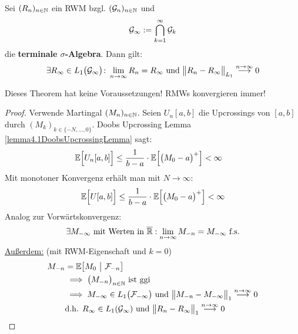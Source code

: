 \begin{theorem}\label{theorem5.5KonvergenzVonRWMs}\enter
Sei $(R_n)_{n\in\mathbb{N}}$ ein RWM bzgl. $(\mathcal{G}_n)_{n\in\mathbb{N}}$ und 
\begin{align*}
\mathcal{G}_\infty:=\bigcap\limits_{k=1}^\infty\mathcal{G}_k
\end{align*}
die \textbf{terminale $\sigma$-Algebra}. Dann gilt:
\begin{align*}
	\exists R_\infty\in L_1\big(\mathcal{G}_\infty\big)\colon\lim\limits_{n\to\infty} R_n=R_\infty \text{ und } \big\Vert R_n-R_\infty\big\Vert_{L_1}\stackrel{n\to\infty}{\longrightarrow}0
\end{align*}
\end{theorem}

\begin{bemerkung}
Dieses Theorem hat keine Voraussetzungen! RMWs konvergieren immer!
\end{bemerkung}

\begin{proof}
	Verwende Martingal $(M_n)_{n\in\mathbb{N}}$. Seien $U_n [ a,b]$ die Upcrossings von $[ a,b]$ durch $(M_k)_{k\in\lbrace-N,\ldots,0\rbrace}$. Doobs Upcrossing Lemma \ref{lemma4.1DoobsUpcrossingLemma} sagt:
\begin{align*}
	\mathbb{E}\Big[U_n[ a,b]\Big]
&\leq
\frac{1}{b-a}\cdot\mathbb{E}\Big[\big(M_0-a\big)^+\Big]<\infty
\end{align*}
Mit monotoner Konvergenz erhält man mit $N\to\infty$:
\begin{align*}
\mathbb{E}\Big[U[a,b]\Big]\leq\frac{1}{b-a}\cdot\mathbb{E}\Big[\big(M_0-a\big)^+\Big]<\infty
\end{align*}
Analog zur Vorwärtskonvergenz:
\begin{align*}
\exists M_{-\infty}\text{ mit Werten in }\overline{\mathbb{R}}:\lim\limits_{n\to\infty} M_{-n}=M_{-\infty}\text{ f.s.}
\end{align*}
\ul{Außerdem:} (mit RWM-Eigenschaft und $k=0$)
\begin{align*}
M_{-n}
&=\mathbb{E}\big[M_0~\big|~\mathcal{F}_{-n}\big]\\
&\implies \big(M_{-n}\big)_{n\in\mathbb{N}}\text{ ist ggi}\\
&\implies M_{-\infty}\in L_1\big(\mathcal{F}_{-\infty}\big)\text{ und }\big\Vert M_{-n}-M_{-\infty}\big\Vert_1\stackrel{n\to\infty}{\longrightarrow}0\\
&\text{d.h. }R_\infty\in L_1(\mathcal{G}_\infty)\text{ und }\big\Vert R_n-R_\infty\big\Vert_1\stackrel{n\to\infty}{\longrightarrow}0
\end{align*}
\end{proof}

